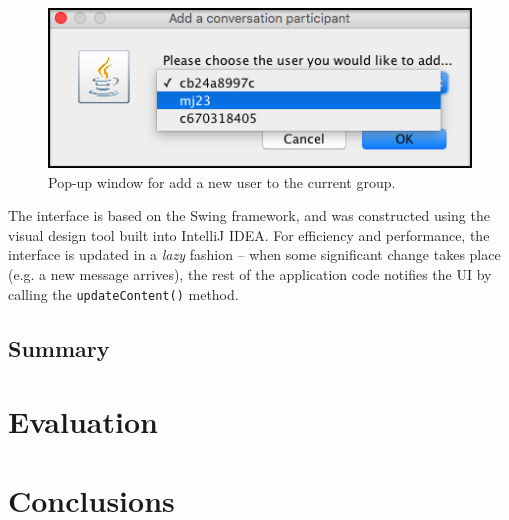 \documentclass[a4paper, 12pt]{report}
\begin{document}
\begin{figure}[H]
    \captionsetup{width=0.84\textwidth}
    \centering
    \includegraphics[width=0.5\linewidth]{pics/GUI_add.png}
    \caption{\label{fig:GUI_add} Pop-up window for add a new user to the current group.}
\end{figure}

The interface is based on the Swing framework, and was constructed using the visual design tool built into IntelliJ IDEA. For efficiency and performance, the interface is updated in a \emph{lazy} fashion -- when some significant change takes place (e.g. a new message arrives), the rest of the application code notifies the UI by calling the \texttt{updateContent()} method.




\section{Summary}


\chapter{Evaluation}


\chapter{Conclusions}





\end{document}

